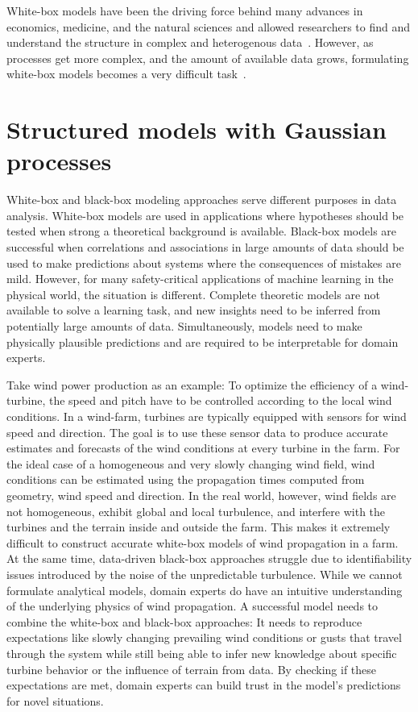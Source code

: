 White-box models have been the driving force behind many advances in economics, medicine, and the natural sciences and allowed researchers to find and understand the structure in complex and heterogenous data~\parencite{efron_modern_2005,giulio_d._agostini_bayesian_2003}.
However, as processes get more complex, and the amount of available data grows, formulating white-box models becomes a very difficult task~\parencite{sutton_bitter_2019}.


\section{Structured models with Gaussian processes}
White-box and black-box modeling approaches serve different purposes in data analysis.
White-box models are used in applications where hypotheses should be tested when strong a theoretical background is available.
Black-box models are successful when correlations and associations in large amounts of data should be used to make predictions about systems where the consequences of mistakes are mild.
However, for many safety-critical applications of machine learning in the physical world, the situation is different.
Complete theoretic models are not available to solve a learning task, and new insights need to be inferred from potentially large amounts of data.
Simultaneously, models need to make physically plausible predictions and are required to be interpretable for domain experts.

Take wind power production as an example:
To optimize the efficiency of a wind-turbine, the speed and pitch have to be controlled according to the local wind conditions.
In a wind-farm, turbines are typically equipped with sensors for wind speed and direction.
The goal is to use these sensor data to produce accurate estimates and forecasts of the wind conditions at every turbine in the farm.
For the ideal case of a homogeneous and very slowly changing wind field, wind conditions can be estimated using the propagation times computed from geometry, wind speed and direction.
In the real world, however, wind fields are not homogeneous, exhibit global and local turbulence, and interfere with the turbines and the terrain inside and outside the farm.
This makes it extremely difficult to construct accurate white-box models of wind propagation in a farm.
At the same time, data-driven black-box approaches struggle due to identifiability issues introduced by the noise of the unpredictable turbulence.
While we cannot formulate analytical models, domain experts do have an intuitive understanding of the underlying physics of wind propagation.
A successful model needs to combine the white-box and black-box approaches:
It needs to reproduce expectations like slowly changing prevailing wind conditions or gusts that travel through the system while still being able to infer new knowledge about specific turbine behavior or the influence of terrain from data.
By checking if these expectations are met, domain experts can build trust in the model's predictions for novel situations.

